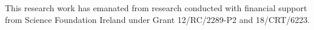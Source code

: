 \documentclass[acmsmall,nonacm]{acmart}
\begin{document}





\begin{acks}
This research work has emanated from research conducted with financial support from Science Foundation Ireland under Grant 12/RC/2289-P2 and 18/CRT/6223.
\end{acks}


\end{document}
